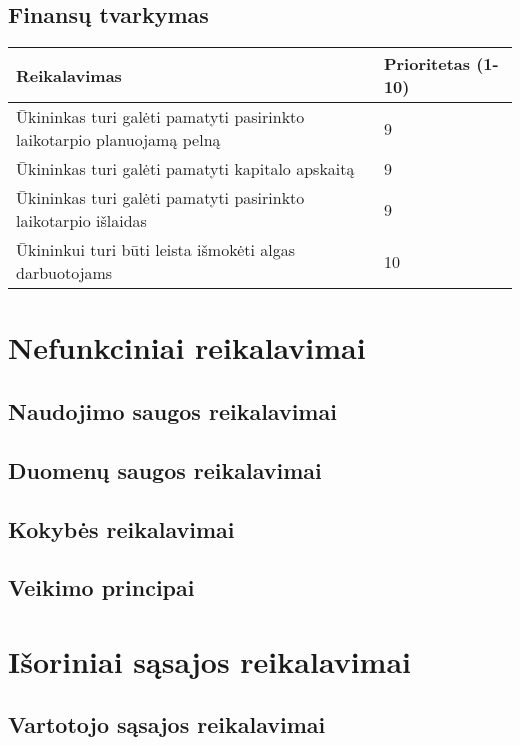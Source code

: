 \documentclass[oneside]{VUMIFPSkursinis}
\begin{document}
\subsection{Finansų tvarkymas}

\begin{table}[htbp]
	\begin{tabularx}{1\textwidth}{ |X|P{3cm }| }
       	          \hline
           	Reikalavimas &  Prioritetas (1-10)  \\   \hline 
        		Ūkininkas turi galėti pamatyti pasirinkto laikotarpio planuojamą pelną  &  9  \\   \hline
         		Ūkininkas turi galėti pamatyti kapitalo apskaitą &  9  \\   \hline
        		Ūkininkas turi galėti pamatyti pasirinkto laikotarpio išlaidas  & 9  \\   \hline
        		Ūkininkui turi būti leista išmokėti algas darbuotojams & 10 \\ \hline
	\end{tabularx}
\end{table}

\section{Nefunkciniai reikalavimai}
\subsection{Naudojimo saugos reikalavimai}
\subsection{Duomenų saugos reikalavimai}
\subsection{Kokybės reikalavimai}

\subsection{Veikimo principai}
\section{Išoriniai sąsajos reikalavimai}
\subsection{Vartotojo sąsajos reikalavimai}
\end{document}
